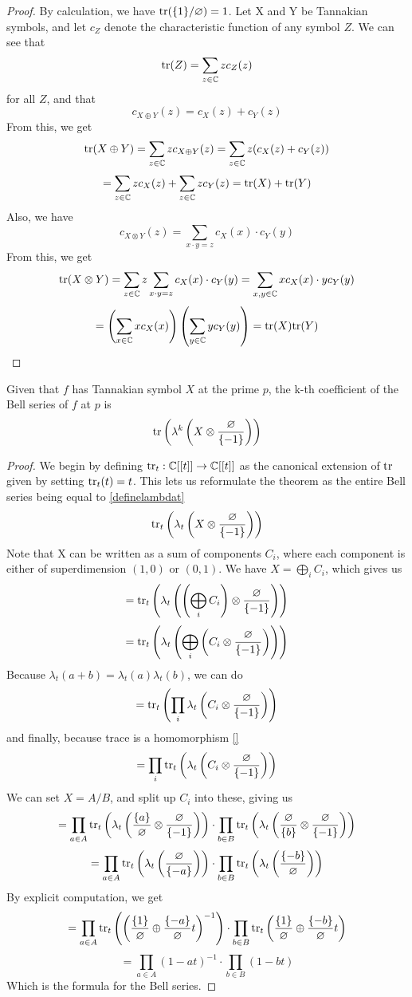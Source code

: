 \begin{proof}
By calculation, we have $\mathrm{tr}(\{1\}/\varnothing) = 1$. Let X and Y be Tannakian symbols, and let $c_Z$ denote the characteristic function of any symbol $Z$. We can see that 
$$\mathrm{tr}(Z) = \sum_{z \in \mathbb{C}} z c_Z(z)$$
for all $Z$, and that 
$$c_{X \oplus Y}(z) = c_X(z) + c_Y(z)$$
From this, we get
$$\mathrm{tr}(X \oplus Y) = \sum_{z \in \mathbb{C}} z c_{X \oplus Y}(z) = \sum_{z \in \mathbb{C}} z (c_X(z) + c_Y(z)) $$
$$ = \sum_{z \in \mathbb{C}} z c_X(z) + \sum_{z \in \mathbb{C}} z c_Y(z) = \mathrm{tr}(X) + \mathrm{tr}(Y)$$
Also, we have 
$$c_{X \otimes Y}(z) = \sum_{x \cdot y=z} c_X(x) \cdot c_Y(y)$$
From this, we get
$$\mathrm{tr}(X \otimes Y) = \sum_{z \in \mathbb{C}} z \sum_{x \cdot y=z}c_X(x) \cdot c_Y(y) = \sum_{x, y \in \mathbb{C}} x c_X(x) \cdot y c_Y(y) $$
$$=\left(\sum_{x \in \mathbb{C}} x c_X(x)\right)\left(\sum_{y \in \mathbb{C}} y c_Y(y)\right) = \mathrm{tr}(X)\mathrm{tr}(Y)$$
\end{proof}

\begin{theorem}
Given that $f$ has Tannakian symbol $X$ at the prime $p$, the k-th coefficient of the Bell series of $f$ at $p$ is
$$\mathrm{tr}\left(\lambda^{k}\left(X \otimes \frac{\varnothing}{\{-1\}}\right)\right)$$
\end{theorem}

\begin{proof}
We begin by defining $\mathrm{tr}_t : \mathbb{C}[[t]] \to \mathbb{C}[[t]]$ as the canonical extension of $\mathrm{tr}$ given by setting $\mathrm{tr}_t(t) = t$. This lets us reformulate the theorem as the entire Bell series being equal to \ref{definelambdat}
$$\mathrm{tr}_t\left(\lambda_t\left(X \otimes \frac{\varnothing}{\{-1\}}\right)\right)$$ 
Note that X can be written as a sum of components $C_i$, where each component is either of superdimension $(1, 0)$ or $(0, 1)$. We have $X = \bigoplus_i C_i$, which gives us
$$=\mathrm{tr}_t\left(\lambda_t\left(\left(\bigoplus_i C_i\right) \otimes \frac{\varnothing}{\{-1\}}\right)\right)$$ 
$$=\mathrm{tr}_t\left(\lambda_t\left(\bigoplus_i \left(C_i \otimes \frac{\varnothing}{\{-1\}}\right)\right)\right)$$ 
Because $\lambda_t(a + b) = \lambda_t(a)\lambda_t(b)$, we can do
$$=\mathrm{tr}_t\left(\prod_i\lambda_t\left(C_i \otimes \frac{\varnothing}{\{-1\}}\right)\right)$$ 
and finally, because trace is a homomorphism \ref{}
$$=\prod_i\mathrm{tr}_t\left(\lambda_t\left(C_i \otimes \frac{\varnothing}{\{-1\}}\right)\right)$$ 
We can set $X = A/B$, and split up $C_i$ into these, giving us 
$$=\prod_{a \in A}\mathrm{tr}_t\left(\lambda_t\left(\frac{\{a\}}{\varnothing} \otimes \frac{\varnothing}{\{-1\}}\right)\right) \cdot \prod_{b \in B}\mathrm{tr}_t\left(\lambda_t\left(\frac{\varnothing}{\{b\}} \otimes \frac{\varnothing}{\{-1\}}\right)\right)$$
$$=\prod_{a \in A}\mathrm{tr}_t\left(\lambda_t\left(\frac{\varnothing}{\{-a\}}\right)\right) \cdot \prod_{b \in B}\mathrm{tr}_t\left(\lambda_t\left(\frac{\{-b\}}{\varnothing}\right)\right)$$
By explicit computation, we get 
$$=\prod_{a \in A}\mathrm{tr}_t\left(\left(\frac{\{1\}}{\varnothing} \oplus \frac{\{-a\}}{\varnothing}t\right)^{-1}\right) \cdot \prod_{b \in B}\mathrm{tr}_t\left(\frac{\{1\}}{\varnothing} \oplus \frac{\{-b\}}{\varnothing}t\right)$$
$$=\prod_{a \in A}\left(1 - at\right)^{-1} \cdot \prod_{b \in B}\left(1 - bt\right)$$
Which is the formula for the Bell series.
\end{proof}

